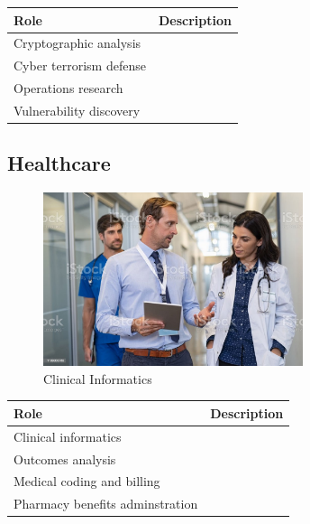 \begin{table}[H]
	\begin{center}
		\begin{tabular}{p{1.3in}|p{3in}} 
			\textbf{Role} & \textbf{Description}\\
			\hline
			Cryptographic analysis & \\
			\hline
			Cyber terrorism defense & \\
			\hline
			Operations research & \\
			\hline
			Vulnerability discovery & \\
			\hline
		\end{tabular}
	\end{center}
\end{table}

\subsection{Healthcare}

\begin{figure}[H]
	\begin{center}
		\caption{Clinical Informatics}
		\vskip 4pt
		\includegraphics[height=2in]{images/careers/istockphoto-1189303763-1024x1024.jpg}
	\end{center}
\end{figure}

\begin{table}[H]
	\begin{center}
		\begin{tabular}{p{1.3in}|p{3in}} 
			\textbf{Role} & \textbf{Description}\\
			\hline
			Clinical informatics & \\
			\hline
			Outcomes analysis & \\
			\hline
			Medical coding and billing & \\
			\hline
			Pharmacy benefits adminstration & \\
			\hline
		\end{tabular}
	\end{center}
\end{table}

